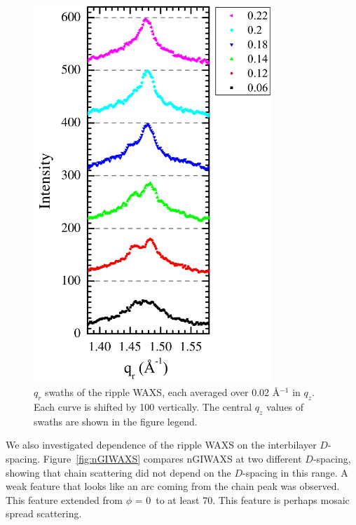 \begin{figure}[htbp]
  \centering
  \includegraphics[width=0.8\textwidth]{figures/ripple/nGIWAXS/qrplots}
  \caption{$q_r$ swaths of the ripple WAXS, each averaged over 0.02 \AA$^{-1}$
  in $q_z$. Each curve is shifted by 100 vertically. 
  The central $q_z$ values of swaths are shown in the figure legend.}
  \label{fig:qrplots}
\end{figure}

We also investigated dependence of the ripple WAXS on the interbilayer
$D$-spacing. Figure~\ref{fig:nGIWAXS} compares nGIWAXS at two different $D$-spacing,
showing that chain scattering did not depend on the $D$-spacing in this range. 
A weak feature that looks like an 
arc coming from the chain peak was observed. This feature extended
from $\phi$ = 0\textdegree\ to at least 70\textdegree. This feature
is perhaps mosaic spread scattering.

